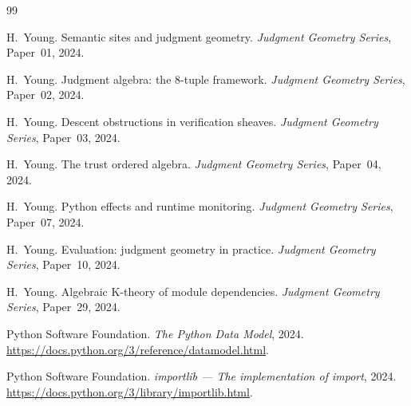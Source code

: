 \documentclass[11pt]{article}
\begin{document}
\begin{thebibliography}{99}

H.~Young.
\newblock Semantic sites and judgment geometry.
\newblock \emph{Judgment Geometry Series}, Paper~01, 2024.

H.~Young.
\newblock Judgment algebra: the 8-tuple framework.
\newblock \emph{Judgment Geometry Series}, Paper~02, 2024.

H.~Young.
\newblock Descent obstructions in verification sheaves.
\newblock \emph{Judgment Geometry Series}, Paper~03, 2024.

H.~Young.
\newblock The trust ordered algebra.
\newblock \emph{Judgment Geometry Series}, Paper~04, 2024.

H.~Young.
\newblock Python effects and runtime monitoring.
\newblock \emph{Judgment Geometry Series}, Paper~07, 2024.

H.~Young.
\newblock Evaluation: judgment geometry in practice.
\newblock \emph{Judgment Geometry Series}, Paper~10, 2024.

H.~Young.
\newblock Algebraic K-theory of module dependencies.
\newblock \emph{Judgment Geometry Series}, Paper~29, 2024.

Python Software Foundation.
\newblock \emph{The Python Data Model}, 2024.
\newblock \url{https://docs.python.org/3/reference/datamodel.html}.

Python Software Foundation.
\newblock \emph{importlib --- The implementation of import}, 2024.
\newblock \url{https://docs.python.org/3/library/importlib.html}.

\end{thebibliography}
\end{document}
